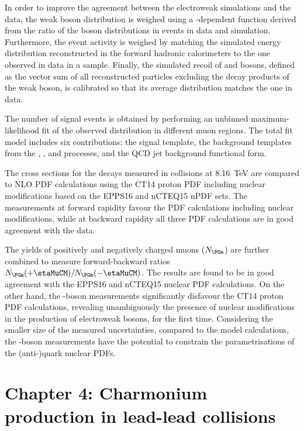 In order to improve the agreement between the electroweak simulations and the data, the weak boson \pt distribution is weighed using a \pt-dependent function derived from the ratio of the {\PZ} boson \pt distributions in \ZToMuMu events in data and simulation. Furthermore, the \pPb event activity is weighed by matching the simulated energy distribution reconstructed in the forward hadronic calorimeters to the one observed in data in a \DYToMuMu sample. Finally, the simulated recoil of {\PW} and {\PZ} bosons, defined as the vector \pt sum of all reconstructed particles excluding the decay products of the weak boson, is calibrated so that its average distribution matches the one in data.

The number of \WToMuNu signal events is obtained by performing an unbinned maximum-likelihood fit of the observed \ptmiss distribution in different muon \etaMuCM regions. The total fit model includes six contributions: the signal \WToMuNu template, the background templates from the \DYToMuMu, \WToTauNu,  \DYToTauTau and \ttbar processes, and the QCD jet background functional form.

The cross sections for the \WToMuNupm decays measured in \RunpPb collisions at \SI{8.16}{\TeV} are compared to  NLO PDF calculations using the CT14 proton PDF including nuclear modifications based on the EPPS16 and nCTEQ15 nPDF sets. The measurements at forward rapidity favour the PDF calculations including nuclear modifications, while at backward rapidity all three PDF calculations are in good agreement with the data.

The yields of positively and negatively charged muons ($N_{\PGm}$) are further combined to measure  forward-backward ratios $N_{\PGm}(+\etaMuCM)/N_{\PGm}(-\etaMuCM)$. The results are found to be in good agreement with the EPPS16 and nCTEQ15 nuclear PDF calculations. On the other hand, the \PW-boson measurements significantly disfavour the CT14 proton PDF calculations, revealing unambiguously the presence of nuclear modifications in the production of electroweak bosons, for the first time. Considering the smaller size of the measured uncertainties, compared to the model calculations, the \PW-boson measurements have the  potential to constrain the parametrisations of the (anti-)quark nuclear PDFs.


\section{Chapter 4: Charmonium production in lead-lead collisions}

